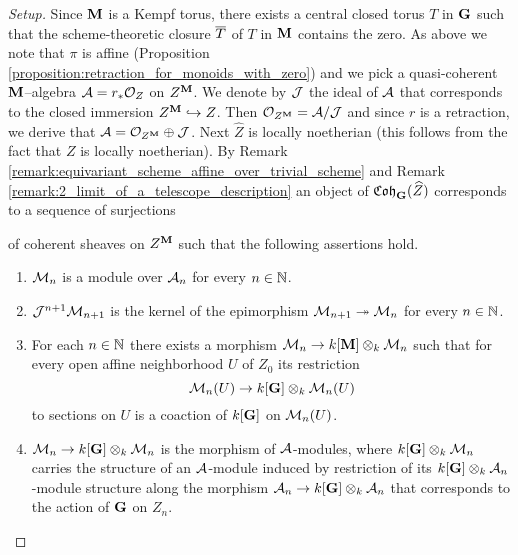 \begin{proof}[Setup]
Since $\mathbf{M}$ is a Kempf torus, there exists a central closed torus $T$ in $\mathbf{G}$ such that the scheme-theoretic closure $\overline{T}$ of $T$ in $\mathbf{M}$ contains the zero. As above we note that $\pi$ is affine (Proposition \ref{proposition:retraction_for_monoids_with_zero}) and we pick a quasi-coherent $\mathbf{M}$--algebra ${\mathcal A} = r_*{\mathcal O}_Z$ on $Z^{\mathbf{M}}$. We denote by ${\mathcal J}$ the ideal of ${\mathcal A}$ that corresponds to the closed immersion $Z^{\mathbf{M}}\hookrightarrow Z$. Then ${\mathcal O}_{Z^{\mathbf{M}}} = {\mathcal A}/{\mathcal J}$ and since $r$ is a retraction, we derive that ${\mathcal A} = {\mathcal O}_{Z^{\mathbf{M}}}\oplus {\mathcal J}$. Next $\widehat{Z}$ is locally noetherian (this follows from the fact that $Z$ is locally noetherian). By Remark \ref{remark:equivariant_scheme_affine_over_trivial_scheme} and Remark \ref{remark:2_limit_of_a_telescope_description} an object of $\mathfrak{Coh}_{\mathbf{G}}(\widehat{Z})$ corresponds to a sequence of surjections
\begin{center}
\end{center}
of coherent sheaves on $Z^{\mathbf{M}}$ such that the following assertions hold.
\begin{enumerate}[label=\textbf{(\arabic*)}, leftmargin=3.0em]
\item ${\mathcal M}_n$ is a module over ${\mathcal A}_n$ for every $n\in {\mathbb N}$.
\item ${\mathcal J}^{n+1}{\mathcal M}_{n+1}$ is the kernel of the epimorphism ${\mathcal M}_{n+1}\twoheadrightarrow {\mathcal M}_n$ for every $n\in {\mathbb N}$.
\item For each $n\in {\mathbb N}$ there exists a morphism ${\mathcal M}_n\rightarrow k[\mathbf{M}]\otimes_k{\mathcal M}_n$ such that for every open affine neighborhood $U$ of $Z_0$ its restriction 
$${\mathcal M}_n(U)\rightarrow k[\mathbf{G}]\otimes_k {\mathcal M}_n(U)$$
to sections on $U$ is a coaction of $k[\mathbf{G}]$ on ${\mathcal M}_n(U)$.
\item ${\mathcal M}_n \rightarrow k[\mathbf{G}]\otimes_k{\mathcal M}_n$ is the morphism of ${\mathcal A}$-modules, where $k[\mathbf{G}]\otimes_k{\mathcal M}_n$ carries the structure of an ${\mathcal A}$-module induced by restriction of its $k[\mathbf{G}]\otimes_k{\mathcal A}_n$-module structure along the morphism ${\mathcal A}_n\rightarrow k[\mathbf{G}]\otimes_k{\mathcal A}_n$ that corresponds to the action of $\mathbf{G}$ on $Z_n$.

\end{enumerate}
\end{proof}

